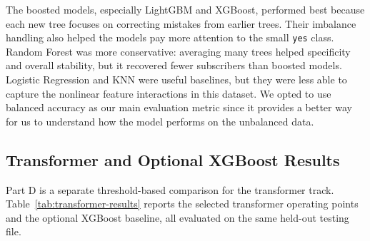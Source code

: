 \documentclass[10pt,twocolumn]{article}
\begin{document}
The boosted models, especially LightGBM and XGBoost, performed best because each new tree focuses on correcting mistakes from earlier trees. Their imbalance handling also helped the models pay more attention to the small \texttt{yes} class. Random Forest was more conservative: averaging many trees helped specificity and overall stability, but it recovered fewer subscribers than boosted models. Logistic Regression and KNN were useful baselines, but they were less able to capture the nonlinear feature interactions in this dataset. We opted to use balanced accuracy as our main evaluation metric since it provides a better way for us to understand how the model performs on the unbalanced data.

\subsection{Transformer and Optional XGBoost Results}

Part D is a separate threshold-based comparison for the transformer track. Table~\ref{tab:transformer-results} reports the selected transformer operating points and the optional XGBoost baseline, all evaluated on the same held-out testing file.

\begin{table}[t]
\centering
\scriptsize
{}
\caption{Selected transformer and optional XGBoost operating points from \texttt{final.ipynb}.}
\label{tab:transformer-results}
\end{table}
\end{document}
